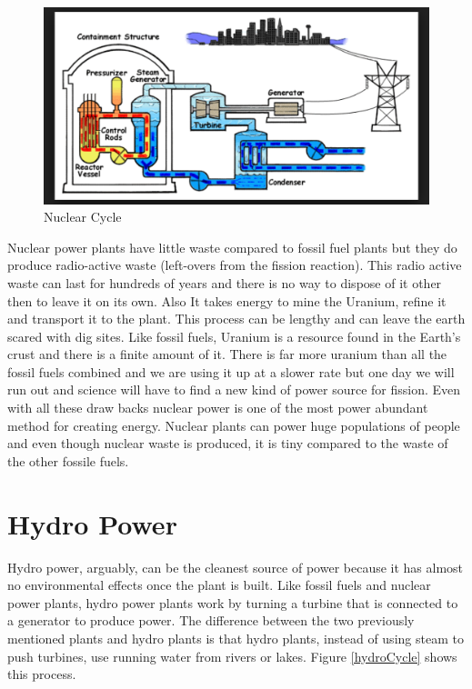 \documentclass[msc,oneside]{ubcthesis}%
\begin{document}
\begin{figure}[hbt]\label{nuclearCycle}
  \begin{center}
    \includegraphics[width=1\textwidth]{nuclear}
    \caption[Nuclear Cycle]{Nuclear Cycle \cite{Nuclear}}
  \end{center}
\end{figure}

Nuclear power plants have little waste compared to fossil fuel plants but they do 
produce radio-active waste (left-overs from the fission reaction). This radio active waste can last for hundreds of years and there is no way to dispose of it other then to leave it on its own. Also It takes energy to mine the Uranium, refine it and transport it to the plant. This process can be lengthy and can leave the earth scared with dig sites. Like fossil fuels, Uranium is a resource found in the Earth's crust and there is a finite amount of it. There is far more uranium than all the fossil fuels combined and we are using it up at a slower rate but one day we will run out and science will have to find a new kind of power source for fission. 
Even with all these draw backs nuclear power is one of the most power abundant method for creating energy. Nuclear plants can power huge populations of people and even though nuclear waste is produced, it is tiny compared to the waste of the other fossile fuels. 

\section{Hydro Power}

Hydro power, arguably, can be the cleanest source of power because it has almost no 
environmental effects once the plant is built. Like fossil fuels and nuclear power plants, hydro power 
plants work by turning a turbine that is connected to a generator to produce power. The difference between the two previously mentioned plants and hydro plants is that hydro plants, instead of using 
steam to push turbines, use running water from rivers or lakes. Figure \ref{hydroCycle} shows this process.
\end{document}
